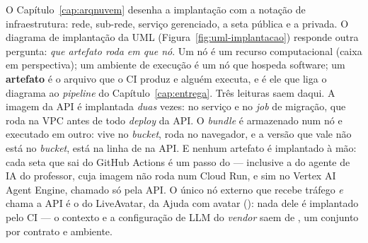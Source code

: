 O Capítulo~\ref{cap:arqnuvem} desenha a implantação com a notação de
infraestrutura: rede, sub-rede, serviço gerenciado, a seta pública e a privada. O
diagrama de implantação da UML (Figura~\ref{fig:uml-implantacao}) responde outra
pergunta: \emph{que artefato roda em que nó}. Um nó é um recurso computacional
(caixa em perspectiva); um ambiente de execução é um nó que hospeda software;
um \textbf{artefato} é o arquivo que o CI produz e alguém executa, e é ele que
liga o diagrama ao \emph{pipeline} do Capítulo~\ref{cap:entrega}. Três leituras
saem daqui. A imagem da API é implantada \emph{duas} vezes: no serviço e no
\emph{job} de migração, que roda  na VPC antes de todo
\emph{deploy} da API. O \emph{bundle} é armazenado num nó e executado em outro: vive
no \emph{bucket}, roda no navegador, e a versão que vale não está no \emph{bucket},
está na linha de  na API. E nenhum artefato é implantado à mão:
cada seta  que sai do GitHub Actions é um passo do  --- inclusive a do
agente de IA do professor, cuja imagem não roda num Cloud Run, e sim no Vertex AI
Agent Engine, chamado só pela API. O único nó externo que recebe tráfego
\emph{e} chama a API é o do LiveAvatar, da Ajuda com avatar (): nada
dele é implantado pelo CI --- o contexto e a configuração de LLM do \emph{vendor}
saem de , um conjunto por contrato e
ambiente.

